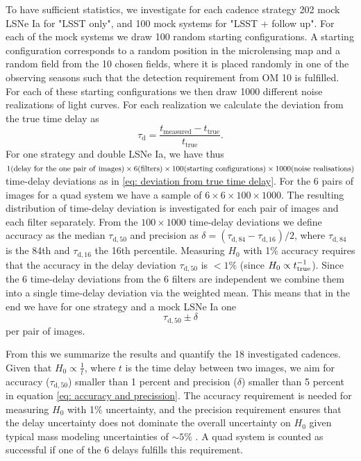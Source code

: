 To have sufficient statistics, we investigate for each cadence
strategy 202 mock LSNe Ia for "LSST only", and 100 mock systems for "LSST + follow up". For each of the mock systems we draw 100 random starting
configurations. A starting configuration corresponds to a random
position in the microlensing map and a random field from the 10 chosen fields, where it is placed randomly in one of the
observing seasons such that the detection requirement from OM 10 is
fulfilled. For each of these starting configurations we then draw 1000
different noise realizations of light curves. For each realization we calculate the deviation from the true time delay as
%
\begin{equation}
\tau_\mathrm{d} = \frac{t_\mathrm{measured} - t_\mathrm{true}}{t_\mathrm{true}}.
\label{eq: deviation from true time delay}
\end{equation}
For one strategy and double LSNe Ia, we have thus $1 {\rm (delay\ for\ the\
one\ pair\ of\ images)} \times 6 {\rm (filters)} \times 100 {\rm
(starting\ configurations)} \times 1000 {\rm (noise\ realisations)}$
time-delay deviations as in \eqref{eq: deviation from true time delay}.
For the 6 pairs of images for a quad system we have a sample of $6
\times 6 \times 100 \times 1000$. The resulting distribution of
time-delay deviation is investigated for each pair of images and each
filter separately. From the $100 \times 1000$ time-delay deviations we
define accuracy as the median $\tau_\mathrm{d,50}$ and precision as
$\delta = (\tau_\mathrm{d,84}-\tau_\mathrm{d,16})/2$, where
$\tau_\mathrm{d,84}$ is the 84th and $\tau_\mathrm{d,16}$ the 16th
percentile. Measuring $H_0$ with 1\% accuracy requires that the accuracy
in the delay deviation $\tau_\mathrm{d,50}$ is $<1\%$ (since $H_0 \propto
t_{\rm true}^{-1}$). Since the 6 time-delay deviations from the 6 filters are independent we combine them into a single time-delay deviation via the weighted mean. This means that in the end we have for one strategy and a mock LSNe Ia one 
\begin{equation}
\tau_\mathrm{d,50} \pm \delta
\label{eq: accuracy and precission}
\end{equation}
per pair of images.

From this we summarize the results and quantify the 18 investigated cadences. Given that $H_0 \propto \frac{1}{t}$, where $t$
is the time delay between two images, we aim for accuracy
($\tau_\mathrm{d,50}$) smaller than 1 percent and precision ($\delta$)
smaller than 5 percent in equation \ref{eq: accuracy and precission}. The accuracy
requirement is needed for measuring $H_0$ with 1\% uncertainty, and
the precision requirement ensures that the delay uncertainty does not
dominate the overall uncertainty on $H_0$ given typical mass modeling
uncertainties of $\sim 5\%$ \citep[e.g.,][]{Suyu2018}.  A quad system is counted as successful if one of the 6 delays fulfills this requirement. 

